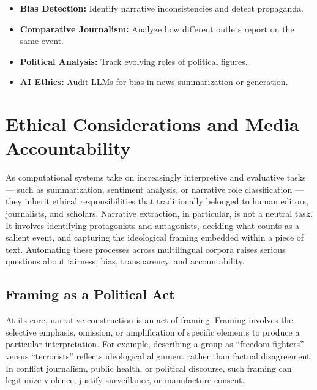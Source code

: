 \documentclass[12pt]{article}
\begin{document}
\begin{itemize}
    \item \textbf{Bias Detection:} Identify narrative inconsistencies and detect propaganda.
    \item \textbf{Comparative Journalism:} Analyze how different outlets report on the same event.
    \item \textbf{Political Analysis:} Track evolving roles of political figures.
    \item \textbf{AI Ethics:} Audit LLMs for bias in news summarization or generation.
\end{itemize}


\section{Ethical Considerations and Media Accountability}

As computational systems take on increasingly interpretive and evaluative tasks — such as summarization, sentiment analysis, or narrative role classification — they inherit ethical responsibilities that traditionally belonged to human editors, journalists, and scholars. Narrative extraction, in particular, is not a neutral task. It involves identifying protagonists and antagonists, deciding what counts as a salient event, and capturing the ideological framing embedded within a piece of text. Automating these processes across multilingual corpora raises serious questions about fairness, bias, transparency, and accountability.

\subsection{Framing as a Political Act}

At its core, narrative construction is an act of framing. Framing involves the selective emphasis, omission, or amplification of specific elements to produce a particular interpretation. For example, describing a group as “freedom fighters” versus “terrorists” reflects ideological alignment rather than factual disagreement. In conflict journalism, public health, or political discourse, such framing can legitimize violence, justify surveillance, or manufacture consent.
\end{document}
